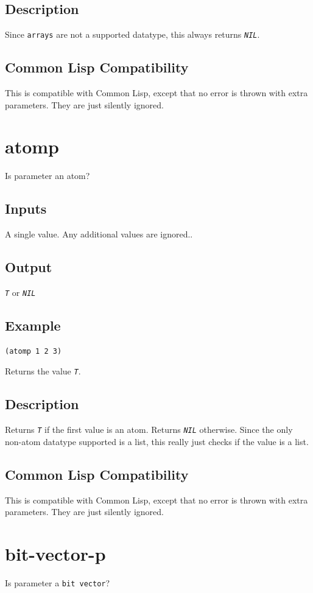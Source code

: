 \documentclass[10pt, openany]{book}
\newcommand{\constant}[1]{\emph{\texttt{#1}}}
\newcommand{\datatype}[1]{\texttt{#1}}
\newcommand{\cl}{Common Lisp}
\begin{document}
\subsection{Description}
Since \datatype{arrays} are not a supported datatype, this always returns \constant{NIL}.
\subsection{Common Lisp Compatibility}
This is compatible with \cl, except that no error is thrown with extra parameters.  They are just silently ignored.

\section{atomp}
Is parameter an atom?
\subsection{Inputs}
A single value.  Any additional values are ignored..
\subsection{Output}
\constant{T} or \constant{NIL}
\subsection{Example}
\begin{lstlisting}
(atomp 1 2 3)
\end{lstlisting}
Returns the value \constant{T}.
\subsection{Description}
Returns \constant{T} if the first value is an atom.  Returns \constant{NIL} otherwise.  Since the only non-atom datatype supported is a list, this really just checks if the value is a list.
\subsection{Common Lisp Compatibility}
This is compatible with \cl, except that no error is thrown with extra parameters.  They are just silently ignored.

\section{bit-vector-p}
Is parameter a \datatype{bit vector}?
\end{document}
